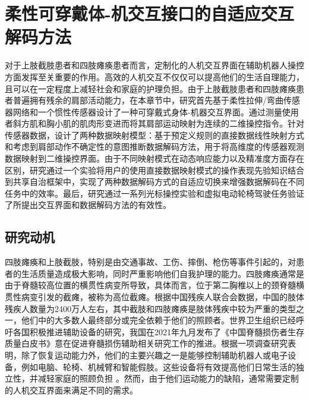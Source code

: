\chapter{柔性可穿戴体-机交互接口的自适应交互解码方法}

对于上肢截肢患者和四肢瘫痪患者而言，定制化的人机交互界面在辅助机器人操控方面发挥至关重要的作用。高效的人机交互不仅仅可以提高他们的生活自理能力，且可以在一定程度上减轻社会和家庭的护理负担。由于上肢截肢患者和四肢瘫痪患者普遍拥有残余的肩部活动能力，在本章节中，研究首先基于柔性拉伸/弯曲传感器网络和一个惯性传感器设计了一种可穿戴式身体-机器交互界面。通过测量使用者斜方肌和胸小肌的肌肉形变进而将其肩部运动映射为连续的二维操控指令。针对传感器数据，设计了两种数据映射模型：基于预定义规则的直接数据线性映射方式和考虑到肩部动作不确定性的意图推断数据解码方法，用于将高维度的传感器观测数据映射到二维操控界面。由于不同映射模式在动态响应能力以及精准度方面存在区别，研究通过一个实验将用户的使用直接数据映射模式的操作表现先验知识结合到共享自治框架中，实现了两种数据解码方式的自适应切换来增强数据解码在不同任务中的效率。最后，研究通过一系列光标操控实验和虚拟电动轮椅驾驶任务验证了所提出交互界面和数据解码方法的有效性。
\section{研究动机}    
四肢瘫痪和上肢截肢，特别是由交通事故、工伤、摔倒、枪伤等事件引起的，对患者的生活质量造成极大影响，同时严重影响他们自我护理的能力。四肢瘫痪通常是由于脊髓较高位置的横贯性病变所导致，具体而言，位于第二胸椎以上的颈脊髓横贯性病变引发的截瘫，被称为高位截瘫。根据中国残疾人联合会数据，中国的肢体残疾人数量为2400万人左右，其中截肢和四肢瘫痪是肢体残疾中较为严重的类型之一，他们中的大多数人最终部分或完全依赖于他们的照顾者\cite{vitorinodinizRachimeduralTraumaEpidemiology2016}。世界卫生组织已经呼吁各国积极推进辅助设备的研究，我国在2021年九月发布了《中国脊髓损伤者生存质量白皮书》意在促进脊髓损伤辅助相关研究工作的推进。根据一项调查研究表明，除了恢复运动能力外，他们的主要兴趣之一是能够控制辅助机器人或电子设备，例如电脑、轮椅、机械臂和智能假肢。这些设备将有效提高他们日常生活的独立性，并减轻家庭的照顾负担    \cite{orejuela-zapataSelfHelpDevicesQuadriplegic2019}。然而，由于他们运动能力的缺陷，通常需要定制的人机交互界面来满足不同的需求。  

